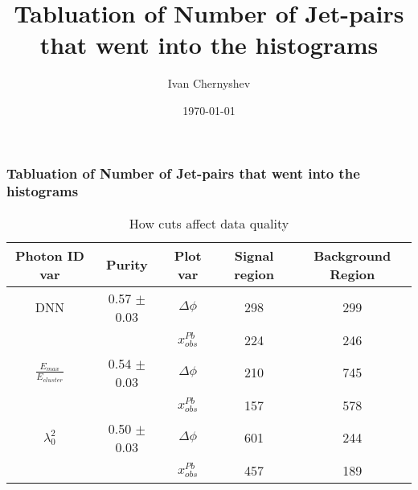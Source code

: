 \documentclass{beamer}
\title{Tabluation of Number of Jet-pairs that went into the histograms}
\author{Ivan Chernyshev}
\date{\today}
\begin{document}
\frame
{
\frametitle{Tabluation of Number of Jet-pairs that went into the histograms}
\begin{table}
\caption{How cuts affect data quality}
\centering
\begin{tabular}{c c c c c}
\hline\hline
Photon ID var & Purity & Plot var & Signal region & Background Region \\ [0.5ex]
\hline
DNN & 0.57 $\pm$ 0.03 & $\Delta \phi$ & 298 & 299 \\ 
&& $x_{obs}^{Pb}$ & 224 & 246 \\ 
\hline
$\frac{E_{max}}{E_{cluster}}$ & 0.54 $\pm$ 0.03 & $\Delta \phi$ & 210 & 745 \\ 
&& $x_{obs}^{Pb}$ & 157 & 578 \\  
\hline
$\lambda_{0}^{2}$ & 0.50 $\pm$ 0.03 & $\Delta \phi$ & 601 & 244 \\ 
&& $x_{obs}^{Pb}$ & 457 & 189 \\
\hline
\end{tabular}
\label{table:nonlin}
\end{table}
}
\end{document}
